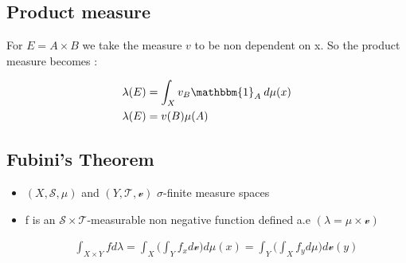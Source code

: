 \subsection{Product measure}
For $E = A \times B$ we take the measure $v$ to be non dependent on x. So the product measure becomes :

\begin{align}
\lambda(E) &= \int_X v_B\mathbbm{1}_A\:d\mu(x) \\
\lambda(E) &= v(B)\mu(A)
\end{align}

\subsection{Fubini's Theorem}
\begin{itemize}
\item $(X, \mathcal{S}, \mu)$ and $(Y, \mathcal{T}, \mathcal{v})$ $\sigma$-finite measure spaces

\item f is an $\mathcal{S} \times \mathcal{T}$-measurable non negative function defined a.e $(\lambda = \mu \times \mathcal{v})$

\begin{align}
\int_{X \times Y}fd\lambda = \int_X \Big(\int_Yf_xd\mathcal{v}\Big)d\mu(x) = \int_Y \Big(\int_Xf_yd\mu\Big)d\mathcal{v}(y)
\end{align}

\end{itemize}

